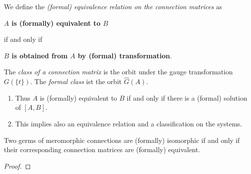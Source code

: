 \begin{defn}
  We define the \emph{(formal) equivalence relation on the connection matrices}
  as
  \begin{einr}
    \textbf{\boldmath$A$ is (formally) equivalent to $B$}
  \end{einr}
  if and only if
  \begin{einr}
    \textbf{\boldmath$B$ is obtained from $A$ by (formal) transformation}.
  \end{einr}
  The \emph{class of a connection matrix} is the orbit under the gauge
  transformation  $G(\!\{t\}\!)$. The \emph{formal class} ist the
  orbit  $\hat G(A)$.
  \begin{s-rem}
    \begin{enumerate}
      \item Thus $A$ is (formally) equivalent to $B$ if and only if there is a
        (formal) solution of $[A,B]$.
      \item This implies also an equivalence relation and a classification on
        the systems.
    \end{enumerate}
  \end{s-rem}
\end{defn}

\begin{prop}
  \begin{comment}
    or corollary?
  \end{comment}
  Two germs of meromorphic connections are (formally) isomorphic if and only if
  their corresponding connection matrices are (formally) equivalent.
\end{prop}
\begin{proof}
  \TODO{}
\end{proof}

